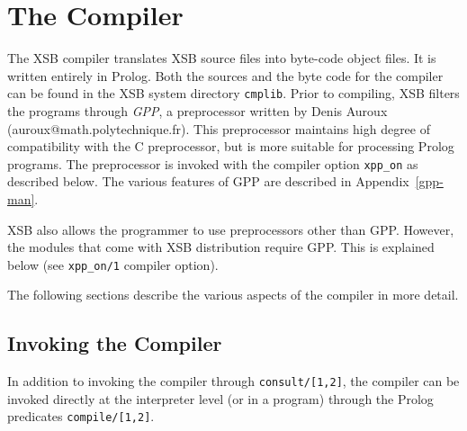 \section{The Compiler} \label{the_compiler} 

The XSB compiler translates XSB source files into
byte-code object files.  It is written entirely in Prolog.
Both the sources and the byte code
for the compiler can be found in the XSB system directory
{\tt cmplib}.
%
Prior to compiling, XSB filters the programs through \emph{GPP}, a 
preprocessor written by Denis Auroux (auroux@math.polytechnique.fr).
This preprocessor maintains high degree of compatibility with the C
preprocessor, but is more suitable for processing Prolog programs.
The preprocessor is invoked with the compiler option \verb|xpp_on|
as described below. The various features of GPP are described in
Appendix~\ref{gpp-man}.

XSB also allows the programmer to use preprocessors other than GPP.
However, the modules that come with XSB distribution require GPP.
This is explained below (see \verb|xpp_on/1| compiler option).

The following sections describe the various aspects of the compiler 
in more detail.


\subsection{Invoking the Compiler} \label{compiler_invoking}

In addition to invoking the compiler through {\tt consult/[1,2]}, the
compiler can be invoked directly at the interpreter level (or in a
program) through the Prolog predicates {\tt compile/[1,2]}. 

